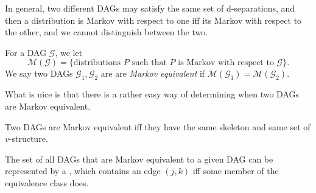 \documentclass[a4paper]{article}
\begin{document}
In general, two different DAGs may satisfy the same set of d-separations, and then a distribution is Markov with respect to one iff its Markov with respect to the other, and we cannot distinguish between the two.

\begin{defi}
  For a DAG $\mathcal{G}$, we let
  \[
    \mathcal{M}(\mathcal{G}) = \{\text{distributions $P$ such that $P$ is Markov with respect to $\mathcal{G}$}\}.
  \]
  We say two DAGs $\mathcal{G}_1, \mathcal{G}_2$ are are \emph{Markov equivalent} if $\mathcal{M}(\mathcal{G}_1) = \mathcal{M}(\mathcal{G}_2)$.
\end{defi}
What is nice is that there is a rather easy way of determining when two DAGs are Markov equivalent.

\begin{prop}
  Two DAGs are Markov equivalent iff they have the same skeleton and same set of $v$-structure.
\end{prop}
The set of all DAGs that are Markov equivalent to a given DAG can be represented by a , which contains an edge $(j, k)$ iff some member of the equivalence class does.
\end{document}
